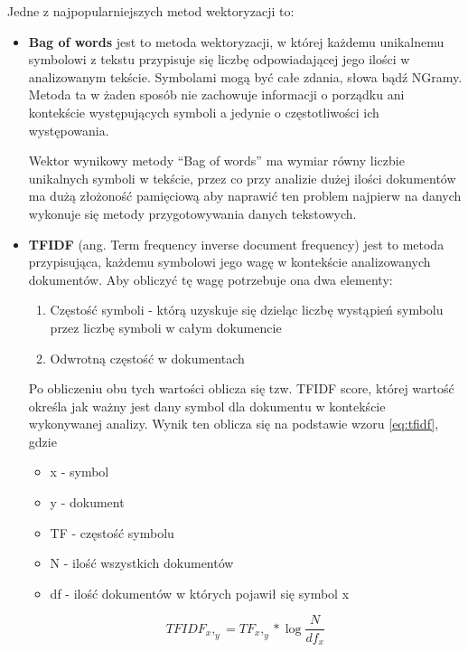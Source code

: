 Jedne z najpopularniejszych metod wektoryzacji to:
\begin{itemize}
    \item \textbf{Bag of words} jest to metoda wektoryzacji, w której każdemu unikalnemu symbolowi z tekstu przypisuje się liczbę 
    odpowiadającej jego ilości w analizowanym tekście. Symbolami mogą być całe zdania, słowa bądź NGramy. 
    Metoda ta w żaden sposób nie zachowuje informacji o porządku ani kontekście występujących symboli a jedynie o 
    częstotliwości ich występowania. 
    
    Wektor wynikowy metody ``Bag of words'' ma wymiar równy liczbie unikalnych symboli w tekście, przez co przy analizie dużej ilości 
    dokumentów ma dużą złożoność pamięciową aby naprawić ten problem najpierw na danych wykonuje się metody przygotowywania danych tekstowych.



    \item \textbf{TFIDF} (ang. Term frequency inverse document frequency) jest to metoda przypisująca, każdemu symbolowi 
    jego wagę w kontekście analizowanych dokumentów. Aby obliczyć tę wagę potrzebuje ona dwa elementy:
    \begin{enumerate}
        \item Częstość symboli - którą uzyskuje się dzieląc liczbę wystąpień symbolu przez liczbę symboli w całym dokumencie
        \item Odwrotną częstość w dokumentach 
    \end{enumerate}
    Po obliczeniu obu tych wartości oblicza się tzw. TFIDF score, której wartość określa jak ważny jest dany symbol 
    dla dokumentu w kontekście wykonywanej analizy. Wynik ten oblicza się na podstawie wzoru \ref{eq:tfidf}, gdzie
    \begin{itemize}
        \item x - symbol
        \item y - dokument
        \item TF - częstość symbolu
        \item N - ilość wszystkich dokumentów
        \item df - ilość dokumentów w których pojawił się symbol x
    \end{itemize}

    \begin{equation}
        \label{eq:tfidf}
        TFIDF_x,_y = TF_x,_y* \log{\frac{N}{df_x}}
    \end{equation}
\end{itemize}